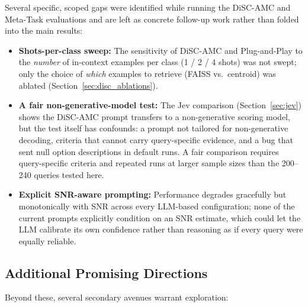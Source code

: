 Several specific, scoped gaps were identified while running the DiSC-AMC and Meta-Task evaluations and are left as concrete follow-up work rather than folded into the main results:
\begin{itemize}
    \item \textbf{Shots-per-class sweep:} The sensitivity of DiSC-AMC and Plug-and-Play to the \emph{number} of in-context examples per class (1 / 2 / 4 shots) was not swept; only the choice of \emph{which} examples to retrieve (FAISS vs.\ centroid) was ablated (Section~\ref{sec:disc_ablations}).
    \item \textbf{A fair non-generative-model test:} The Jev comparison (Section~\ref{sec:jev}) shows the DiSC-AMC prompt transfers to a non-generative scoring model, but the test itself has confounds: a prompt not tailored for non-generative decoding, criteria that cannot carry query-specific evidence, and a bug that sent null option descriptions in default runs. A fair comparison requires query-specific criteria and repeated runs at larger sample sizes than the 200--240 queries tested here.
    \item \textbf{Explicit SNR-aware prompting:} Performance degrades gracefully but monotonically with SNR across every LLM-based configuration; none of the current prompts explicitly condition on an SNR estimate, which could let the LLM calibrate its own confidence rather than reasoning as if every query were equally reliable.
\end{itemize}

\subsection{Additional Promising Directions}

Beyond these, several secondary avenues warrant exploration:

